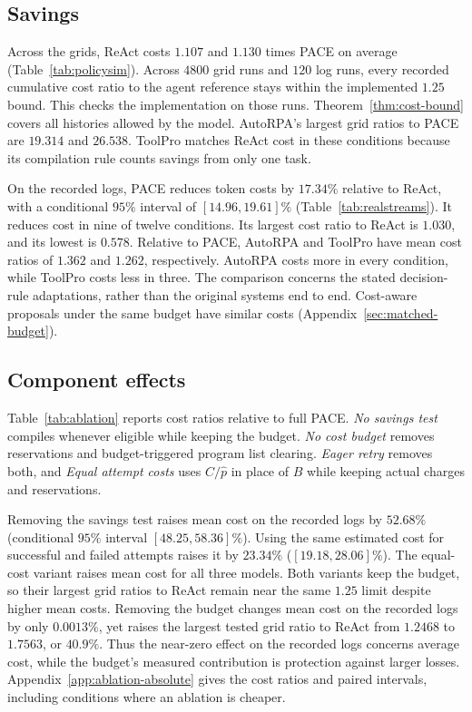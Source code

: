 \subsection{Savings}
\label{sec:savings}

Across the grids, ReAct costs $1.107$ and $1.130$ times PACE on average (Table~\ref{tab:policysim}).
Across $4800$ grid runs and $120$ log runs, every recorded cumulative cost ratio to the agent reference stays within the implemented $1.25$ bound.
This checks the implementation on those runs.
Theorem~\ref{thm:cost-bound} covers all histories allowed by the model.
AutoRPA's largest grid ratios to PACE are $19.314$ and $26.538$.
ToolPro matches ReAct cost in these conditions because its compilation rule counts savings from only one task.



On the recorded logs, PACE reduces token costs by $17.34\%$ relative to ReAct, with a conditional $95\%$ interval of $[14.96,19.61]\%$ (Table~\ref{tab:realstreams}).
It reduces cost in nine of twelve conditions.
Its largest cost ratio to ReAct is $1.030$, and its lowest is $0.578$.
Relative to PACE, AutoRPA and ToolPro have mean cost ratios of $1.362$ and $1.262$, respectively.
AutoRPA costs more in every condition, while ToolPro costs less in three.
The comparison concerns the stated decision-rule adaptations, rather than the original systems end to end.
Cost-aware proposals under the same budget have similar costs (Appendix~\ref{sec:matched-budget}).

\subsection{Component effects}
\label{sec:ablation}

Table~\ref{tab:ablation} reports cost ratios relative to full PACE.
\emph{No savings test} compiles whenever eligible while keeping the budget.
\emph{No cost budget} removes reservations and budget-triggered program list clearing.
\emph{Eager retry} removes both, and \emph{Equal attempt costs} uses $C/\hat p$ in place of $\hat B$ while keeping actual charges and reservations.



Removing the savings test raises mean cost on the recorded logs by $52.68\%$ (conditional $95\%$ interval $[48.25,58.36]\%$).
Using the same estimated cost for successful and failed attempts raises it by $23.34\%$ ($[19.18,28.06]\%$).
The equal-cost variant raises mean cost for all three models.
Both variants keep the budget, so their largest grid ratios to ReAct remain near the same $1.25$ limit despite higher mean costs.
Removing the budget changes mean cost on the recorded logs by only $0.0013\%$, yet raises the largest tested grid ratio to ReAct from $1.2468$ to $1.7563$, or $40.9\%$.
Thus the near-zero effect on the recorded logs concerns average cost, while the budget's measured contribution is protection against larger losses.
Appendix~\ref{app:ablation-absolute} gives the cost ratios and paired intervals, including conditions where an ablation is cheaper.

